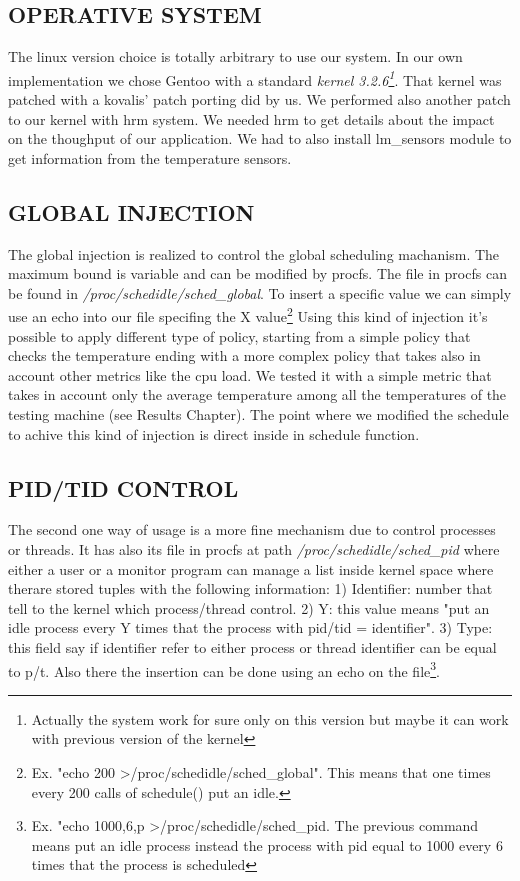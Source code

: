 \documentclass[journal]{IEEEtran}
\begin{document}
\subsection{OPERATIVE SYSTEM}
The linux version choice is totally arbitrary to use our system. In our own implementation we chose Gentoo with a standard \emph{kernel 3.2.6\footnote{Actually the system work for sure only on this version but maybe it can work with previous version of the kernel}}.
That kernel was patched with a kovalis' patch porting did by us. We performed also another patch to our kernel with hrm system. We needed hrm to get details about the impact on the thoughput of our application.
We had to also install lm\_sensors module to get information from the temperature sensors.


\subsection{GLOBAL INJECTION}
The global injection is realized to control the global scheduling machanism. The maximum bound is variable and can be modified by procfs. The file in procfs can be found in \emph{/proc/schedidle/sched\_global}. 
To insert a specific value we can simply use an echo into our file specifing the X value\footnote{Ex. "echo 200 \textgreater  /proc/schedidle/sched\_global". This means that one times every 200 calls of schedule() put an idle.} 
Using this kind of injection it's possible to apply different type of policy, starting from a simple policy that checks the temperature ending with a more complex policy that takes also in account other metrics like the cpu load. 
We tested it with a simple metric that takes in account only the average temperature among all the temperatures of the testing machine (see Results Chapter).
The point where we modified the schedule to achive this kind of injection is direct inside in schedule function.  

\subsection{PID/TID CONTROL}
The second one way of usage is a more fine mechanism due to control processes or threads. It has also its file in procfs at path \emph{/proc/schedidle/sched\_pid} where either a user or a monitor program can manage a list inside kernel space where therare stored tuples with the following information: 1) Identifier: number that tell to the kernel which process/thread control. 2) Y: this value means "put an idle process every Y times that the process with pid/tid = identifier". 3) Type: this field say if identifier refer to either process or thread identifier can be equal to p/t.
Also there the insertion can be done using an echo on the file\footnote{Ex. "echo 1000,6,p \textgreater /proc/schedidle/sched\_pid. The previous command means put an idle process instead the process with pid equal to 1000 every 6 times that the process is scheduled }.
\end{document}
